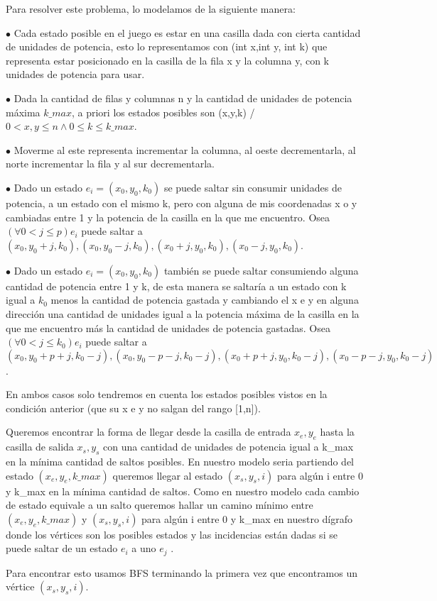 Para resolver este problema, lo modelamos de la siguiente manera:

$\bullet$ Cada estado posible en el juego es estar en una casilla dada con cierta cantidad de unidades de potencia, esto lo representamos con (int x,int y, int k) que representa estar posicionado en la casilla de la fila x y la columna y, con k unidades de potencia para usar.

$\bullet$ Dada la cantidad de filas y columnas n y la cantidad de unidades de potencia máxima $k\_max$, a priori los estados posibles son (x,y,k) / $0 < x,y \leq n \wedge 0 \leq k \leq k\_max$. 

$\bullet$ Moverme al este representa incrementar la columna, al oeste decrementarla, al norte incrementar la fila y al sur decrementarla.

$\bullet$ Dado un estado $e_i = (x_0,y_0,k_0)$ se puede saltar sin consumir unidades de potencia, a un estado con el mismo k, pero con alguna de mis coordenadas x o y cambiadas entre 1 y la potencia de la casilla en la que me encuentro. Osea  $(\forall 0 < j \leq p ) e_i$ puede saltar a $(x_0,y_0+j,k_0), (x_0,y_0-j,k_0), (x_0+j,y_0,k_0), (x_0-j,y_0,k_0)$.

$\bullet$ Dado un estado $e_i = (x_0,y_0,k_0)$ también se puede saltar consumiendo alguna cantidad de potencia entre 1 y k, de esta manera se saltaría a un estado con k igual a $k_0$ menos la cantidad de potencia gastada y cambiando el x e y en alguna dirección una cantidad de unidades igual a la potencia máxima de la casilla en la que me encuentro más la cantidad de unidades de potencia gastadas. Osea $(\forall 0 < j \leq k_0 ) e_i$ puede saltar a $(x_0,y_0+p+j,k_0-j), (x_0,y_0-p-j,k_0-j), (x_0+p+j,y_0,k_0-j), (x_0-p-j,y_0,k_0-j)$. 

En ambos casos solo tendremos en cuenta los estados posibles vistos en la condición anterior (que su x e y no salgan del rango [1,n]).

Queremos encontrar la forma de llegar desde la casilla de entrada $x_e,y_e$ hasta la casilla de salida $x_s,y_s$ con una cantidad de unidades de potencia igual a k\_max en la mínima cantidad de saltos posibles. En nuestro modelo seria partiendo del estado $(x_e,y_e,k\_max)$ queremos llegar al estado $(x_s,y_s,i)$ para algún i entre 0 y k\_max en la mínima cantidad de saltos. Como en nuestro modelo cada cambio de estado equivale a un salto queremos hallar un camino mínimo entre $(x_e,y_e,k\_max)$ y $(x_s,y_s,i)$ para algún i entre 0 y k\_max en nuestro dígrafo donde los vértices son los posibles estados y las incidencias están dadas si se puede saltar de un estado $e_i$ a uno $e_j$ .

Para encontrar esto usamos BFS terminando la primera vez que encontramos un vértice $(x_s,y_s,i)$.




